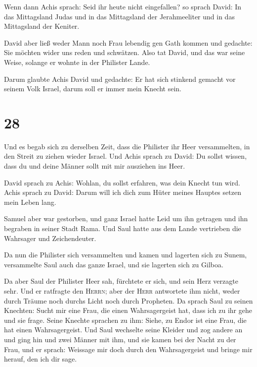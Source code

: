  Wenn dann Achis sprach: Seid ihr heute nicht
eingefallen? so sprach David: In das Mittagsland Judas und in das
Mittagsland der Jerahmeeliter und in das Mittagsland der Keniter.

 David aber ließ weder Mann noch Frau lebendig gen Gath
kommen und gedachte: Sie möchten wider uns reden und schwätzen. Also tat
David, und das war seine Weise, solange er wohnte in der Philister
Lande.

 Darum glaubte Achis David und gedachte: Er hat sich
stinkend gemacht vor seinem Volk Israel, darum soll er immer mein Knecht
sein.

\hypertarget{section-27}{%
\section{28}\label{section-27}}

 Und es begab sich zu derselben Zeit, dass die Philister
ihr Heer versammelten, in den Streit zu ziehen wieder Israel. Und Achis
sprach zu David: Du sollst wissen, dass du und deine Männer sollt mit
mir ausziehen ins Heer.

 David sprach zu Achis: Wohlan, du sollst erfahren, was
dein Knecht tun wird. Achis sprach zu David: Darum will ich dich zum
Hüter meines Hauptes setzen mein Leben lang.

 Samuel aber war gestorben, und ganz Israel hatte Leid um
ihn getragen und ihn begraben in seiner Stadt Rama. Und Saul hatte aus
dem Lande vertrieben die Wahrsager und Zeichendeuter.

 Da nun die Philister sich versammelten und kamen und
lagerten sich zu Sunem, versammelte Saul auch das ganze Israel, und sie
lagerten sich zu Gilboa.

 Da aber Saul der Philister Heer sah, fürchtete er sich,
und sein Herz verzagte sehr.  Und er ratfragte den
\textsc{Herrn}; aber der \textsc{Herr} antwortete ihm nicht, weder durch
Träume noch durchs Licht noch durch Propheten.  Da sprach
Saul zu seinen Knechten: Sucht mir eine Frau, die einen Wahrsagergeist
hat, dass ich zu ihr gehe und sie frage. Seine Knechte sprachen zu ihm:
Siehe, zu Endor ist eine Frau, die hat einen Wahrsagergeist.
 Und Saul wechselte seine Kleider und zog andere an und
ging hin und zwei Männer mit ihm, und sie kamen bei der Nacht zu der
Frau, und er sprach: Weissage mir doch durch den Wahrsagergeist und
bringe mir herauf, den ich dir sage.

